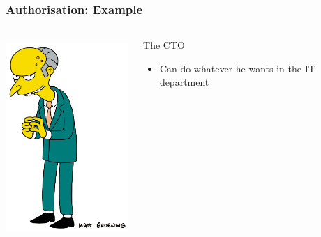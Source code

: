 \documentclass{beamer}
\begin{document}
\begin{frame}
\frametitle{Authorisation: Example}
\begin{columns}
 \begin{column}{0.45\textwidth}
         \includegraphics[height=7.5cm]{./pics/simpsons/Montgomery_Burns.png}
 \end{column}
 \begin{column}{0.45\textwidth}
    \begin{block}{The CTO}
        \begin{itemize}
            \item Can do whatever he wants in the IT department
        \end{itemize}
    \end{block}
 \end{column}
\end{columns}
\end{frame}
\end{document}
